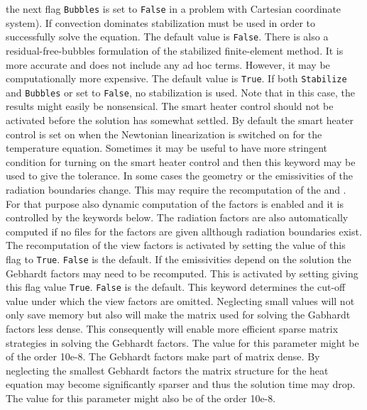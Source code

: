 the next flag {\tt Bubbles} is set to {\tt False} in a problem with Cartesian
coordinate system).
If convection dominates stabilization must be used in order to successfully solve the equation.
The default value is {\tt False}.
There is also a residual-free-bubbles formulation of the stabilized finite-element
method. It is more accurate and does not include any ad hoc terms. However, it may
be computationally more expensive. The default value is {\tt True}.
If both {\tt Stabilize} and {\tt Bubbles} or set to {\tt False}, no stabilization
is used. Note that in this case, the results might easily be nonsensical.
The smart heater control should not be activated before the 
solution has somewhat settled. By default the smart heater 
control is set on when the Newtonian linearization is 
switched on for the temperature equation. Sometimes
it may be useful to have more stringent condition for 
turning on the smart heater control and then this keyword
may be used to give the tolerance. 
%
\sifend
In some cases the geometry or the emissivities of the radiation boundaries 
change. This may require the recomputation of the  and 
. For that purpose also dynamic computation of the factors
is enabled and it is controlled by the keywords below.
The radiation factors are also automatically computed if
no files for the factors are given allthough radiation boundaries
exist. 
\sifbegin
{}
The recomputation of the view factors is activated by 
setting the value of this flag to \texttt{True}.
%
\texttt{False} is the default.
If the emissivities depend on the solution the Gebhardt factors may need to 
be recomputed. This is activated by setting giving this flag value \texttt{True}.
\texttt{False} is the default.
%
This keyword determines the cut-off value under which the view factors are
omitted. Neglecting small values will not only save memory but also will
make the matrix used for solving the Gabhardt factors less dense. 
This consequently will enable more efficient sparse matrix strategies
in solving the Gebhardt factors.
The value for this parameter might be of the order 10e-8. 
%
The Gebhardt factors make part of matrix dense. By neglecting the smallest Gebhardt factors
the matrix structure for the heat equation 
may become significantly sparser and thus the solution time may drop.
The value for this parameter might also be of the order 10e-8. 
